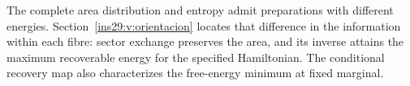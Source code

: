 The complete area distribution and entropy admit preparations with different
energies. Section~\ref{ins29:v:orientacion} locates that difference in the
information within each fibre: sector exchange preserves the area, and its
inverse attains the maximum recoverable energy for the specified Hamiltonian.
The conditional recovery map also characterizes the free-energy minimum
at fixed marginal.


